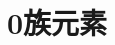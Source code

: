 \documentclass{ctexart}
\title{\tbf{VA族元素}}
\author{夜未央}
\begin{document}
\maketitle
\newpage
\section{0族元素}
\end{document}
